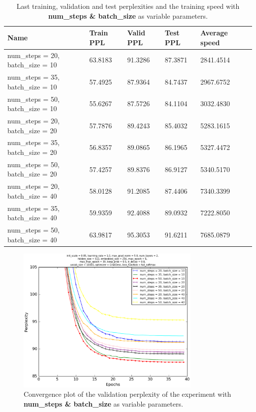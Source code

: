 \documentclass[10pt,a4paper,titlepage]{article}
\begin{document}
\begin{table}[H]
\centering
\caption{Last training, validation and test perplexities and the training speed with \textbf{num\_steps \& batch\_size} as variable parameters.}
\label{tab:exp6data}
\begin{tabular}{|l|l|l|l|l|l|}
\hline
{\small Name} & {\small Train PPL} & {\small Valid PPL} & {\small Test PPL} & {\small Average speed}\\ \hline
{\small num\_steps = 20, batch\_size = 10}               & 63.8183    & 91.3286    & 87.3871    & 2841.4514  \\ \hline
{\small num\_steps = 35, batch\_size = 10}               & 57.4925    & 87.9364    & 84.7437    & 2967.6752  \\ \hline
{\small num\_steps = 50, batch\_size = 10}               & 55.6267    & 87.5726    & 84.1104    & 3032.4830  \\ \hline
{\small num\_steps = 20, batch\_size = 20}               & 57.7876    & 89.4243    & 85.4032    & 5283.1615  \\ \hline
{\small num\_steps = 35, batch\_size = 20}               & 56.8357    & 89.0865    & 86.1965    & 5327.4472  \\ \hline
{\small num\_steps = 50, batch\_size = 20}               & 57.4257    & 89.8376    & 86.9127    & 5340.5170  \\ \hline
{\small num\_steps = 20, batch\_size = 40}               & 58.0128    & 91.2085    & 87.4406    & 7340.3399  \\ \hline
{\small num\_steps = 35, batch\_size = 40}               & 59.9359    & 92.4088    & 89.0932    & 7222.8050  \\ \hline
{\small num\_steps = 50, batch\_size = 40}               & 63.9817    & 95.3053    & 91.6211    & 7685.0879  \\ \hline
\end{tabular}
\end{table}

\begin{figure}[H]
	\begin{center}
		\includegraphics[width=0.80\textwidth]{Figures/numstepsbatchperf.eps}
		\caption{Convergence plot of the validation perplexity of the experiment with \textbf{num\_steps \& batch\_size} as variable parameters. }
		\label{fig:exp6perf}
	\end{center}	
\end{figure}
\end{document}
